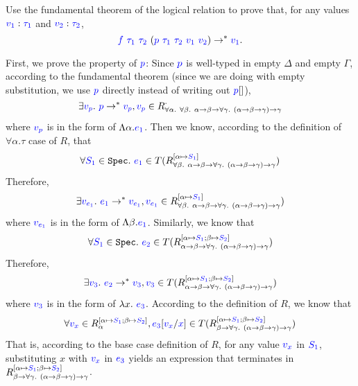 \documentclass{article}
\theoremstyle{definition}
\newcommand{\meta}[1]{{\color{blue}#1}}
\begin{document}
\begin{enumerate}[start=1,label={{\bf Problem \arabic*}.},ref=\arabic*,left=0pt..0pt,widest*=10,align=left,itemindent=*]
\begin{enumerate}[(a),left=1em]
    Use the fundamental theorem of the logical relation to prove that, for any values
    $\meta{v_1}:\meta{\tau_1}$ and $\meta{v_2}:\meta{\tau_2}$,
    \[
      \meta{f}\ \meta{\tau_1}\ \meta{\tau_2}\ (\meta{p}\ \meta{\tau_1}\ \meta{\tau_2}\ \meta{v_1}\ \meta{v_2}) \to^* \meta{v_1}.
    \]
  \end{enumerate}
  First, we prove the property of $\meta{p}$:
  Since $\meta{p}$ is well-typed in empty $\Delta$ and empty $\Gamma$, according to the fundamental theorem (since we are doing with empty substitution, we use $\meta{p}$ directly instead of writing out $\meta{p}[]$), $$\exists \meta{v_p}.\ \meta{p} \to^* \meta{v_p}, \meta{v_p} \in R^\cdot_{\forall \alpha.\ \forall \beta.\ \alpha \to \beta \to \forall \gamma.\ (\alpha \to \beta \to \gamma) \to \gamma}$$
  where $\meta{v_p}$ is in the form of $\Lambda \alpha. \meta{e_1}$. Then we know, according to the definition of $\forall\alpha. \tau$ case of $R$, that $$\forall \meta{S_1} \in \mathtt{Spec}.\ \meta{e_1} \in T(R^{[\alpha\mapsto \meta{S_1}]}_{\forall \beta.\ \alpha \to \beta \to \forall \gamma.\ (\alpha \to \beta \to \gamma) \to \gamma})$$
  Therefore, $$\exists \meta{v_{e_1}}.\ \meta{e_1} \to^* \meta{v_{e_1}}, \meta{v_{e_1}} \in R^{[\alpha\mapsto\meta{S_1}]}_{\forall \beta.\ \alpha \to \beta \to \forall \gamma.\ (\alpha \to \beta \to \gamma) \to \gamma})$$
  where $\meta{v_{e_1}}$ is in the form of $\Lambda \beta. \meta{e_1}$. Similarly, we know that $$\forall \meta{S_1}\in \mathtt{Spec}.\ \meta{e_2}\in T(R^{[\alpha\mapsto\meta{S_1};\beta\mapsto\meta{S_2}]}_{\alpha \to \beta \to \forall \gamma.\ (\alpha \to \beta \to \gamma) \to \gamma})$$
  Therefore, $$\exists \meta{v_3}.\ \meta{e_2} \to^* \meta{v_3}, \meta{v_3}\in T(R^{[\alpha\mapsto\meta{S_1};\beta\mapsto\meta{S_2}]}_{\alpha \to \beta \to \forall \gamma.\ (\alpha \to \beta \to \gamma) \to \gamma})$$
  where $\meta{v_3}$ is in the form of $\lambda x.\ \meta{e_3}$. According to the definition of $R$, we know that
  $$\forall \meta{v_x}\in R^{[\alpha\mapsto\meta{S_1};\beta\mapsto\meta{S_2}]}_{\alpha}, \meta{e_3}[\meta{v_x}/\meta{x}] \in T(R^{[\alpha\mapsto\meta{S_1};\beta\mapsto\meta{S_2}]}_{\beta \to \forall \gamma.\ (\alpha \to \beta \to \gamma) \to \gamma})$$
  That is, according to the base case definition of $R$, for any value $\meta{v_x}$ in $\meta{S_1}$, substituting $x$ with $\meta{v_x}$ in $\meta{e_3}$ yields an expression that terminates in $R^{[\alpha\mapsto\meta{S_1};\beta\mapsto\meta{S_2}]}_{\beta \to \forall \gamma.\ (\alpha \to \beta \to \gamma) \to \gamma}$. 


\end{enumerate}
\end{document}
